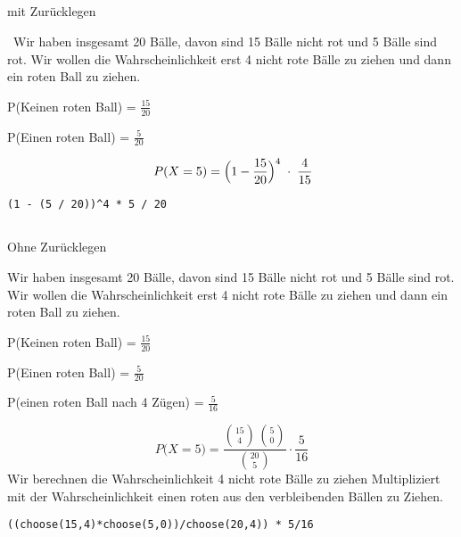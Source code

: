 \subsection*{\centering{}}
\begin{center}
\normalsize
\textcolor{red}{\warning}\textcolor{red}{\warning} mit Zurücklegen \textcolor{red}{\warning}\textcolor{red}{\warning}
\end{center}
\normalsize
\
Wir haben insgesamt 20 Bälle, davon sind 15 Bälle nicht rot
und 5 Bälle sind rot. Wir wollen die Wahrscheinlichkeit erst 4
nicht rote Bälle zu ziehen und dann ein roten Ball zu ziehen.
\begin{mdframed}[linecolor=yellow, linewidth=2pt]
P(Keinen roten Ball) = $\frac{15}{20}$

P(Einen roten Ball) = $\frac{5}{20}$
\end{mdframed}
\large{
\[\;P(X = 5)
= \Bigl(1 - \frac{15}{20}\Bigr)^{4}
\;\cdot\;\frac{4}{15}
\]}

\begin{lstlisting}
(1 - (5 / 20))^4 * 5 / 20
\end{lstlisting}


\subsection*{\centering{}}
\begin{center}
\normalsize
\textcolor{red}{\warning}\textcolor{red}{\warning} Ohne Zurücklegen \textcolor{red}{\warning}\textcolor{red}{\warning}
\end{center}
\normalsize
Wir haben insgesamt 20 Bälle, davon sind 15 Bälle nicht rot und 5 Bälle sind rot.
Wir wollen die Wahrscheinlichkeit erst 4 nicht rote Bälle zu ziehen und dann ein roten Ball zu ziehen.
\begin{mdframed}[linecolor=yellow, linewidth=2pt]
P(Keinen roten Ball) = $\frac{15}{20}$

P(Einen roten Ball) = $\frac{5}{20}$

P(einen roten Ball nach 4 Zügen) = $\frac{5}{16}$
\end{mdframed}

\large{
\[
P\bigl(X = 5\bigr)
= \frac{\binom{15}{4}\,\binom{5}{0}}{\binom{20}{5}} \cdot \frac{5}{16}
\]}
Wir berechnen die Wahrscheinlichkeit 4 nicht rote Bälle zu ziehen Multipliziert mit der Wahrscheinlichkeit einen roten aus den verbleibenden Bällen zu Ziehen.
\begin{lstlisting}
((choose(15,4)*choose(5,0))/choose(20,4)) * 5/16
\end{lstlisting}
